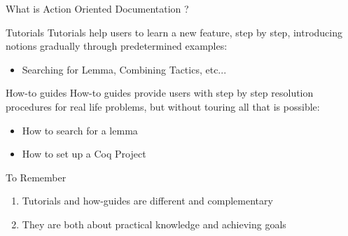 \documentclass[10pt]{beamer}
\begin{document}
\begin{frame}{What is Action Oriented Documentation ?}
  \vspace*{-4pt}
  \begin{tcbProp}{Tutorials}
    Tutorials help users to learn a new feature, step by step, introducing
    notions gradually through predetermined examples:
    \begin{itemize}[label=$\hookrightarrow$]
      \item<1-> Searching for Lemma, Combining Tactics, etc...
    \end{itemize}
  \end{tcbProp}
  \vspace*{-4pt}
  \begin{tcbProp}{How-to guides}
    How-to guides provide users with step by step resolution procedures for real
    life problems, but without touring all that is possible:
    \begin{itemize}[label=$\hookrightarrow$]
      \item<2-> How to search for a lemma
      \item<2-> How to set up a Coq Project
    \end{itemize}
  \end{tcbProp}
  \vspace*{-4pt}
  \begin{tcbSol}{To Remember}
    \begin{enumerate}
      \item<3-> Tutorials and how-guides are different and complementary
      \item<4-> They are both about practical knowledge and achieving goals
    \end{enumerate}
  \end{tcbSol}
\end{frame}
\end{document}
